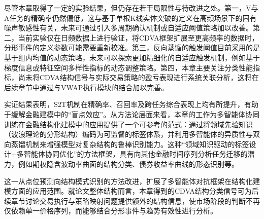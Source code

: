 尽管本章取得了一定的实验结果，但仍存在若干局限性与待改进之处。第一，V与A任务的精确率仍然偏低，这与基于单根K线实体突破的定义在高频场景下的固有噪声敏感性有关，未来可通过引入多周期确认机制或自适应阈值策略加以改善。第二，当前实验仅在日频数据上进行验证，将CDVA框架扩展至更高频率的数据时，分形事件的定义参数可能需要重新校准。第三，反向蒸馏的触发阈值目前采用的是基于组内均值的动态策略，未来可以探索更加精细化的自适应触发机制，例如基于梯度信息或特征空间多样性指标的动态调整策略。第四，本章主要关注分类性能指标，尚未将CDVA结构信号与实际交易策略的盈亏表现进行系统关联分析，这将在后续章节中通过与VWAP执行模块的结合加以完善。

实证结果表明，S2T机制在精确率、召回率及跨任务综合表现上均有所提升，有助于缓解金融建模中的``盲点效应''。从方法论层面来看，本章的工作为多智能体协同训练在金融结构化建模中的应用提供了一个可参考的范式：通过将领域先验知识（波浪理论的分形结构）编码为可监督的标签体系，并利用多智能体的异质性与双向蒸馏机制来增强模型对复杂结构的鲁棒识别能力。这种``领域知识驱动的标签设计+多智能体协同优化''的方法框架，具有向其他金融时间序列分析任务迁移的潜力，例如期权隐含波动率曲面的结构分类、债券收益率曲线的形态识别等。

这一从点位预测向结构模式识别的方法改进，扩展了多智能体对抗框架在结构化建模方面的应用范围。就论文整体结构而言，本章得到的CDVA结构分类信号可为后续章节讨论交易执行与策略映射问题提供额外的结构信息，使市场阶段的判断不再仅依赖单一价格序列，而能够结合分形事件与趋势有效性进行分析。

